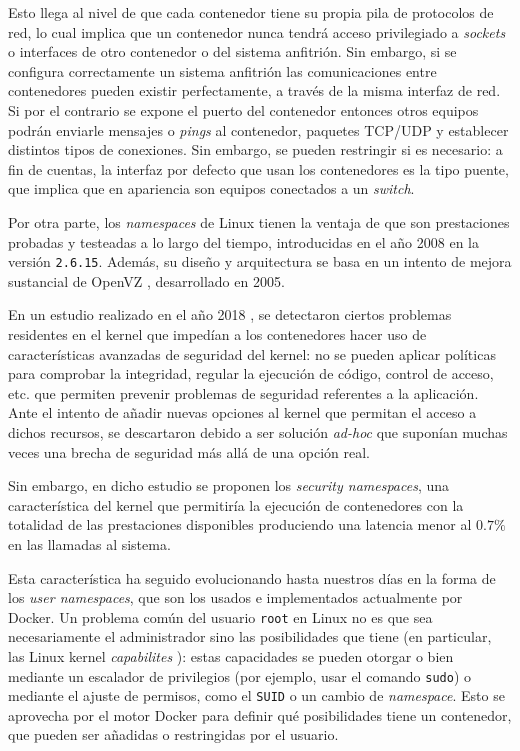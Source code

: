 Esto llega al nivel de que cada contenedor tiene su propia pila de protocolos de
red, lo cual implica que un contenedor nunca tendrá acceso privilegiado a \textit{sockets}
o interfaces de otro contenedor o del sistema anfitrión. Sin embargo, si se configura
correctamente un sistema anfitrión las comunicaciones entre contenedores pueden
existir perfectamente, a través de la misma interfaz de red. Si por el contrario se
expone el puerto del contenedor entonces otros equipos podrán enviarle mensajes
o \textit{pings} al contenedor, paquetes TCP/UDP y establecer distintos tipos de
conexiones. Sin embargo, se pueden restringir si es necesario: a fin de cuentas,
la interfaz por defecto que usan los contenedores es la tipo puente, que implica
que en apariencia son equipos conectados a un \textit{switch}.

Por otra parte, los \textit{namespaces} de Linux tienen la ventaja de que son
prestaciones probadas y testeadas a lo largo del tiempo, introducidas en el año
2008 en la versión \texttt{2.6.15}. Además, su diseño y arquitectura
se basa en un intento de mejora sustancial de OpenVZ \autocite{OpenVZ2021},
desarrollado en 2005.

En un estudio realizado en el año 2018 \autocite{sunSecurityNamespaceMaking2018}, se
detectaron ciertos problemas residentes en el kernel que impedían a los contenedores
hacer uso de características avanzadas de seguridad del kernel: no se pueden
aplicar políticas para comprobar la integridad, regular la ejecución de código,
control de acceso, etc. que permiten prevenir problemas de seguridad referentes
a la aplicación. Ante el intento de añadir nuevas opciones al kernel que permitan
el acceso a dichos recursos, se descartaron debido a ser solución \textit{ad-hoc}
que suponían muchas veces una brecha de seguridad más allá de una opción
real.

Sin embargo, en dicho estudio se proponen los \textit{security namespaces}, una
característica del kernel que permitiría la ejecución de contenedores con la
totalidad de las prestaciones disponibles produciendo una latencia menor al
$0.7\%$ en las llamadas al sistema.

Esta característica ha seguido evolucionando hasta nuestros días en la forma de
los \textit{user namespaces}, que son los usados e implementados actualmente
por Docker. Un problema común del usuario \texttt{root} en Linux no es que sea
necesariamente el administrador sino las posibilidades que tiene (en particular,
las Linux kernel \textit{capabilites} \autocite{CapabilitiesLinuxManual}):
estas capacidades se pueden otorgar o bien mediante un escalador de privilegios
(por ejemplo, usar el comando \texttt{sudo}) o mediante el ajuste de permisos,
como el \texttt{SUID} o un cambio de \textit{namespace}. Esto se aprovecha por
el motor Docker para definir qué posibilidades tiene un contenedor, que pueden
ser añadidas o restringidas por el usuario.


